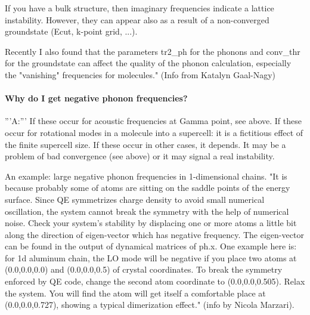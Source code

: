 \documentclass[12pt,a4paper]{article}
\begin{document}
If you have a bulk structure, then imaginary frequencies indicate a 
lattice instability. However, they can appear also as a result of a 
non-converged groundstate (Ecut, k-point grid, ...).

Recently I also found that the parameters tr2\_ph for the phonons and 
conv\_thr for the groundstate can affect the quality of the phonon 
calculation, especially the "vanishing" frequencies for molecules."
(Info from Katalyn Gaal-Nagy)

\paragraph{ Why do I get negative phonon frequencies? }
'''A:''' If these occur for acoustic frequencies at Gamma point, see above.
If these occur for rotational modes in a molecule into a supercell: 
it is a fictitious effect of the finite supercell size. If these
occur in other cases, it depends. It may be a problem of bad
convergence (see above) or it may signal a real instability.

An example: large negative phonon frequencies in 1-dimensional chains.
"It is because probably some of atoms are sitting on the saddle points 
of the energy surface. Since QE symmetrizes charge density to avoid small 
numerical oscillation, the system cannot break the symmetry with the help 
of numerical noise. Check your system's stability by displacing one or more 
atoms a little bit along the direction of eigen-vector which has negative 
frequency. The eigen-vector can be found in the output of dynamical matrices 
of ph.x. One example here is: for 1d aluminum chain, the LO mode will be 
negative if you place two atoms at (0.0,0.0,0.0) and (0.0,0.0,0.5) of crystal 
coordinates. To break the symmetry enforced by QE code, change the second atom 
coordinate to (0.0,0.0,0.505). Relax the system. You will find the atom will 
get itself a comfortable place at (0.0,0.0,0.727), showing a typical
dimerization effect." (info by Nicola Marzari).
\end{document}
